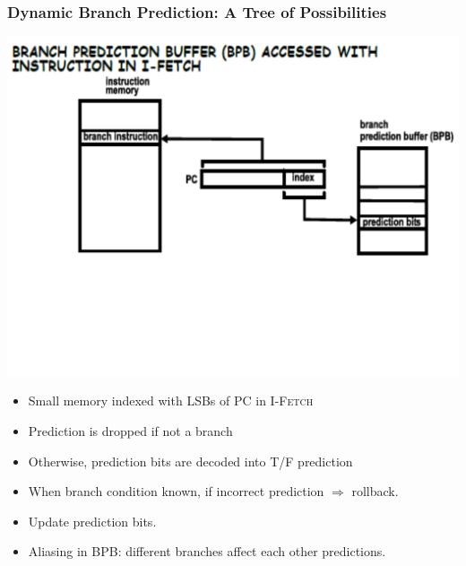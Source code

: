 \documentclass{beamer}
\begin{document}
\begin{frame}[fragile,t]
\frametitle{Dynamic Branch Prediction: A Tree of Possibilities}

\includegraphics[width=55ex]{FigsOoOProc/BranchPredSimple.pdf}
\vspace{-14ex}
\pause


\begin{itemize}
    \item Small memory indexed with LSBs of PC in \textsc{I-Fetch}
    \item Prediction is dropped if not a branch
    \item Otherwise, prediction bits are decoded into T/F prediction
    \item When branch condition known, if incorrect prediction $\Rightarrow$ rollback.
    \item Update prediction bits.
    \item Aliasing in BPB: different branches affect each other predictions.
\end{itemize}
\end{frame}
\end{document}
